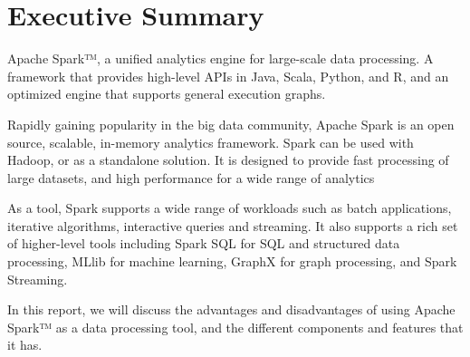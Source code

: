 \section{Executive Summary}

Apache Spark™, a unified analytics engine for large-scale data processing. A
framework that provides high-level APIs in Java, Scala, Python, and R, and an
optimized engine that supports general execution graphs. 

Rapidly gaining popularity in the big data community, Apache Spark is an open
source, scalable, in-memory analytics framework. Spark can be used with
Hadoop, or as a standalone solution. It is designed to provide fast processing
of large datasets, and high performance for a wide range of analytics

As a tool, Spark supports a wide range of workloads such as batch applications,
iterative algorithms, interactive queries and streaming. It also supports a rich
set of higher-level tools including Spark SQL for SQL and structured data
processing, MLlib for machine learning, GraphX for graph processing, and
Spark Streaming.

In this report, we will discuss the advantages and disadvantages of using Apache
Spark™ as a data processing tool, and the different components and features that
it has.

\newpage